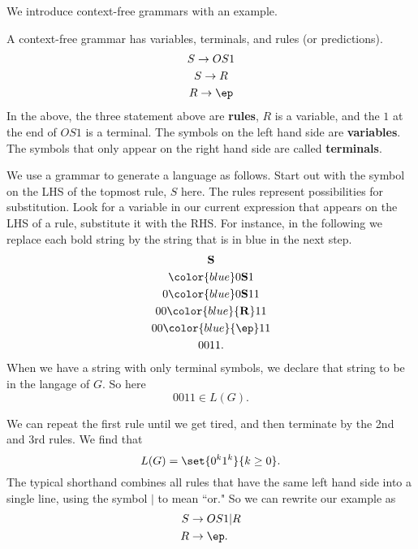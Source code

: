 We introduce context-free grammars with an example.

A context-free grammar has variables, terminals, and rules (or predictions).
\begin{gather*}
S\to OS1\\
S\to R\\
R\to \ep
\end{gather*}
In the above, the three statement above are \textbf{rules}, $R$ is a variable, and the $1$ at the end of $OS1$ is a terminal. The symbols on the left hand side are \textbf{variables}. The symbols that only appear on the right hand side are called \textbf{terminals}.

We use a grammar to generate a language as follows. Start out with the symbol on the LHS of the topmost rule, $S$ here. The rules represent possibilities for substitution. Look for a variable in our current expression that appears on the LHS of a rule, substitute it with the RHS. For instance, in the following we replace each bold string by the string that is in blue in the next step.
\begin{gather*}
\bf{S}\\
{\color{blue} 0{\bf S}1}\\
0{\color{blue} 0{\bf S}1}1\\
00{\color{blue} {\bf R}}11\\
00{\color{blue} {\bf \ep}}11\\
0011.
\end{gather*}
When we have a string with only terminal symbols, we declare that string to be in the langage of $G$. So here
\[
0011\in L(G).
\]

\vskip0.15in

We can repeat the first rule until we get tired, and then terminate by the 2nd and 3rd rules. We find that 
\[L(G)=\set{0^k1^k}{k\ge 0}.\]
The typical shorthand combines all rules that have the same left hand side into a single line, using the symbol $|$ to mean ``or." So we can rewrite our example as
\begin{align*}
S&\to OS1| R\\
R& \to \ep.
\end{align*}


